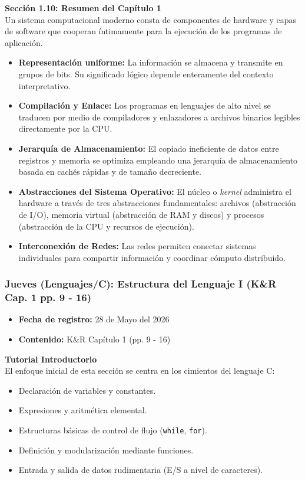 \documentclass[11pt, a4paper]{article}
\begin{document}
\noindent\textbf{Sección 1.10: Resumen del Capítulo 1}\\[0.5em]
Un sistema computacional moderno consta de componentes de hardware y capas de software que cooperan íntimamente para la ejecución de los programas de aplicación.

\begin{itemize}
  \item \textbf{Representación uniforme:} La información se almacena y transmite en grupos de bits. Su significado lógico depende enteramente del contexto interpretativo.
  \item \textbf{Compilación y Enlace:} Los programas en lenguajes de alto nivel se traducen por medio de compiladores y enlazadores a archivos binarios legibles directamente por la CPU.
  \item \textbf{Jerarquía de Almacenamiento:} El copiado ineficiente de datos entre registros y memoria se optimiza empleando una jerarquía de almacenamiento basada en cachés rápidas y de tamaño decreciente.
  \item \textbf{Abstracciones del Sistema Operativo:} El núcleo o \textit{kernel} administra el hardware a través de tres abstracciones fundamentales: archivos (abstracción de I/O), memoria virtual (abstracción de RAM y discos) y procesos (abstracción de la CPU y recursos de ejecución).
  \item \textbf{Interconexión de Redes:} Las redes permiten conectar sistemas individuales para compartir información y coordinar cómputo distribuido.
\end{itemize}



\subsubsection{Jueves (Lenguajes/C): Estructura del Lenguaje I (K\&R Cap. 1 pp. 9 - 16)}
\begin{itemize}
  \item[] \textbf{Fecha de registro:} 28 de Mayo del 2026
  \item[] \textbf{Contenido:} K\&R Capítulo 1 (pp. 9 - 16)
\end{itemize}

\noindent\textbf{Tutorial Introductorio}\\[0.5em]
El enfoque inicial de esta sección se centra en los cimientos del lenguaje C:
\begin{itemize}
  \item Declaración de variables y constantes.
  \item Expresiones y aritmética elemental.
  \item Estructuras básicas de control de flujo (\texttt{while}, \texttt{for}).
  \item Definición y modularización mediante funciones.
  \item Entrada y salida de datos rudimentaria (E/S a nivel de caracteres).
\end{itemize}
\end{document}
